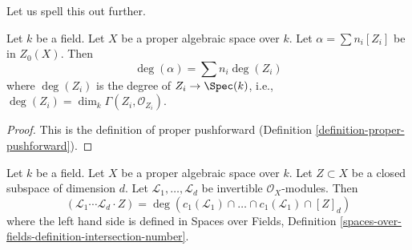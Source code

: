 \noindent
Let us spell this out further.

\begin{lemma}
\label{lemma-spell-out-degree-zero-cycle}
Let $k$ be a field. Let $X$ be a proper algebraic space over $k$.
Let $\alpha = \sum n_i[Z_i]$ be in $Z_0(X)$. Then
$$
\deg(\alpha) = \sum n_i\deg(Z_i)
$$
where $\deg(Z_i)$ is the degree of $Z_i \to \Spec(k)$, i.e.,
$\deg(Z_i) = \dim_k \Gamma(Z_i, \mathcal{O}_{Z_i})$.
\end{lemma}

\begin{proof}
This is the definition of proper pushforward
(Definition \ref{definition-proper-pushforward}).
\end{proof}

\begin{lemma}
\label{lemma-degrees-and-numerical-intersections}
Let $k$ be a field. Let $X$ be a proper algebraic space over $k$.
Let $Z \subset X$ be a closed subspace of dimension $d$.
Let $\mathcal{L}_1, \ldots, \mathcal{L}_d$ be invertible
$\mathcal{O}_X$-modules. Then
$$
(\mathcal{L}_1 \cdots \mathcal{L}_d \cdot Z) =
\deg(
c_1(\mathcal{L}_1) \cap \ldots \cap c_1(\mathcal{L}_1) \cap [Z]_d)
$$
where the left hand side is defined in
Spaces over Fields, Definition
\ref{spaces-over-fields-definition-intersection-number}.
\end{lemma}


